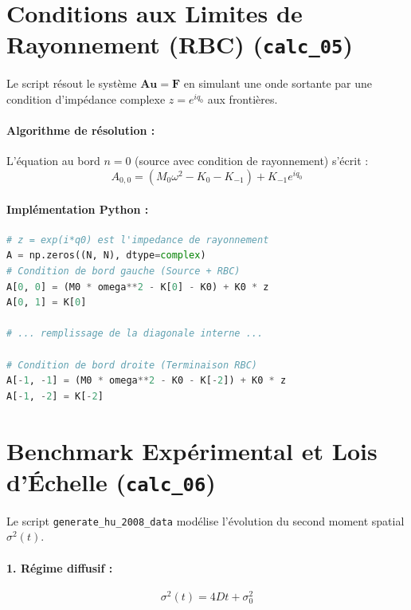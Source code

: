 \section{Conditions aux Limites de Rayonnement (RBC) (\texttt{calc\_05})}

Le script résout le système $\mathbf{A} \mathbf{u} = \mathbf{F}$ en simulant une onde sortante par une condition d'impédance complexe $z = e^{iq_0}$ aux frontières.

\paragraph{Algorithme de résolution :}
L'équation au bord $n=0$ (source avec condition de rayonnement) s'écrit :
\begin{equation}
    A_{0,0} = (M_0 \omega^2 - K_0 - K_{-1}) + K_{-1} e^{iq_0}
\end{equation}

\paragraph{Implémentation Python :}
\begin{lstlisting}[language=Python, caption={Inversion de matrice avec conditions aux limites de rayonnement}]
# z = exp(i*q0) est l'impedance de rayonnement
A = np.zeros((N, N), dtype=complex)
# Condition de bord gauche (Source + RBC)
A[0, 0] = (M0 * omega**2 - K[0] - K0) + K0 * z
A[0, 1] = K[0]

# ... remplissage de la diagonale interne ...

# Condition de bord droite (Terminaison RBC)
A[-1, -1] = (M0 * omega**2 - K0 - K[-2]) + K0 * z
A[-1, -2] = K[-2]
\end{lstlisting}

\section{Benchmark Expérimental et Lois d'Échelle (\texttt{calc\_06})}

Le script \texttt{generate\_hu\_2008\_data} modélise l'évolution du second moment spatial $\sigma^2(t)$.

\paragraph{1. Régime diffusif :}
\begin{equation}
    \sigma^2(t) = 4D t + \sigma_0^2
\end{equation}

